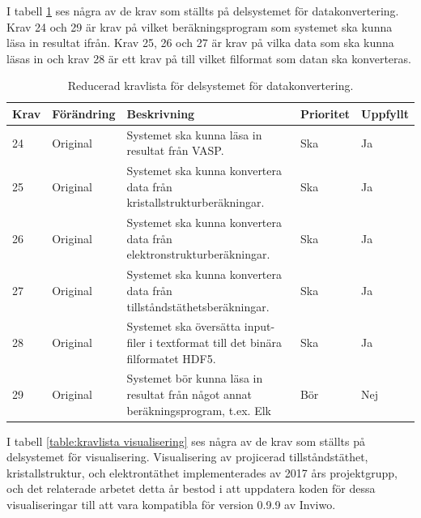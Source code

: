 \documentclass[a4paper,12pt,twoside,openright]{report}
\begin{document}
I tabell \ref{table:kravlista datakonvertering} ses några av de krav som ställts på delsystemet för datakonvertering. Krav 24 och 29 är krav på vilket beräkningsprogram som systemet ska kunna läsa in resultat ifrån. Krav 25, 26 och 27 är krav på vilka data som ska kunna läsas in och krav 28 är ett krav på till vilket filformat som datan ska konverteras. 
\begin{table}[H]
\caption{Reducerad kravlista för delsystemet för datakonvertering.}
\begin{center}
\begin{tabular}{ |p{10mm}|p{20mm}|p{70mm}|p{15mm}|p{15mm}|}
\hline
 \textbf{Krav} & \textbf{Förändring} & \textbf{Beskrivning} & \textbf{Prioritet} & \textbf{Uppfyllt}  \\ 
\hline
24 & Original & Systemet ska kunna läsa in resultat från VASP. & Ska & Ja \\
\hline
25 & Original & Systemet ska kunna konvertera data från kristallstrukturberäkningar. & Ska & Ja \\
\hline
26 & Original & Systemet ska kunna konvertera data från elektronstrukturberäkningar. & Ska & Ja \\
\hline
27 & Original & Systemet ska kunna konvertera data från tillståndstäthetsberäkningar. & Ska & Ja \\
\hline
28 & Original & Systemet ska översätta input-filer i textformat till det binära filformatet HDF5. & Ska & Ja \\
\hline
29 & Original & Systemet bör kunna läsa in resultat från något annat beräkningsprogram, t.ex. Elk & Bör & Nej \\
\hline
\end{tabular}
\label{table:kravlista datakonvertering}
\end{center}
\end{table}


I tabell \ref{table:kravlista visualisering} ses några av de krav som ställts på delsystemet för visualisering. Visualisering av projicerad tillståndstäthet, kristallstruktur, och elektrontäthet implementerades av 2017 års projektgrupp, och det relaterade arbetet detta år bestod i att uppdatera koden för dessa visualiseringar till att vara kompatibla för version 0.9.9 av Inviwo. 
\end{document}
